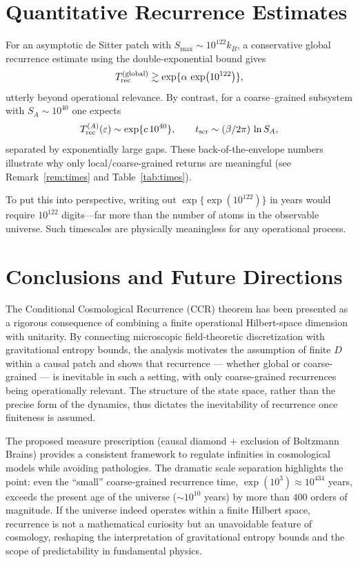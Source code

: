\documentclass[12pt]{article}
\newcommand{\Smax}{S_{\max}}
\theoremstyle{remark}
\begin{document}
\section{Quantitative Recurrence Estimates}
For an asymptotic de Sitter patch with $\Smax\sim 10^{122} k_B$, a conservative global recurrence estimate using the double-exponential bound gives
\[
 T^{\rm (global)}_{\text{rec}} \gtrsim \exp\{\alpha\,\exp(10^{122})\},
\]
utterly beyond operational relevance. By contrast, for a coarse--grained subsystem with $S_A\sim 10^{40}$ one expects
\[
 T^{(A)}_{\rm rec}(\varepsilon) \sim \exp\{c\,10^{40}\},\qquad t_{\rm scr} \sim (\beta/2\pi)\,\ln S_A,
\]
separated by exponentially large gaps. These back-of-the-envelope numbers illustrate why only local/coarse-grained returns are meaningful (see Remark~\ref{rem:times} and Table~\ref{tab:times}).

To put this into perspective, writing out $\exp\{\exp(10^{122})\}$ in years would require $10^{122}$ digits---far more than 
the number of atoms in the observable universe. Such timescales are physically meaningless for any operational process.


\section{Conclusions and Future Directions}

The Conditional Cosmological Recurrence (CCR) theorem has been presented as a rigorous 
consequence of combining a finite operational Hilbert-space dimension with unitarity. 
By connecting microscopic field-theoretic discretization with gravitational entropy bounds, 
the analysis motivates the assumption of finite $D$ within a causal patch and shows that 
recurrence --- whether global or coarse-grained --- is inevitable in such a setting, with 
only coarse-grained recurrences being operationally relevant. 
The structure of the state space, rather than the precise form of the dynamics, thus dictates 
the inevitability of recurrence once finiteness is assumed. 

The proposed measure prescription (causal diamond + exclusion of Boltzmann Brains) 
provides a consistent framework to regulate infinities in cosmological models while avoiding 
pathologies. The dramatic scale separation highlights the point: even the ``small'' 
coarse-grained recurrence time, $\exp(10^{3}) \approx 10^{434}$ years, exceeds the present 
age of the universe ($\sim 10^{10}$ years) by more than $400$ orders of magnitude. 
If the universe indeed operates within a finite Hilbert space, recurrence is not a mathematical 
curiosity but an unavoidable feature of cosmology, reshaping the interpretation of 
gravitational entropy bounds and the scope of predictability in fundamental physics.  
\end{document}
